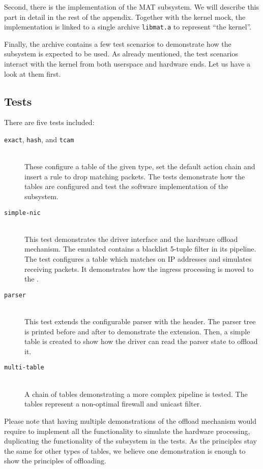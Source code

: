 Second, there is the implementation of the MAT subsystem. We will describe this
part in detail in the rest of the appendix. Together with the kernel mock, the
implementation is linked to a single archive \texttt{libmat.a} to represent
``the kernel''.

Finally, the archive contains a few test scenarios to demonstrate how the
subsystem is expected to be used. As already mentioned, the test scenarios
interact with the kernel from both userspace and hardware ends. Let us have
a look at them first.

\subsection{Tests}

There are five tests included:

\begin{description}
	\item[\texttt{exact}, \texttt{hash}, and \texttt{tcam}] \hfill \\
		These configure a table of the given type, set the default action chain
		and insert a rule to drop matching packets. The tests demonstrate how
		the tables are configured and test the software implementation of the
		subsystem.

	\item[\texttt{simple-nic}] \hfill \\
		This test demonstrates the driver interface and the hardware offload
		mechanism. The emulated  contains a blacklist 5-tuple filter in
		its pipeline. The test configures a table which matches on IP addresses
		and simulates receiving packets. It demonstrates how the ingress
		processing is moved to the .

	\item[\texttt{parser}] \hfill \\
		This test extends the configurable parser with the  header.
		The parser tree is printed before and after to demonstrate the
		extension. Then, a simple table is created to show how the driver can
		read the parser state to offload it.

	\item[\texttt{multi-table}] \hfill \\
		A chain of tables demonstrating a more complex pipeline is tested.
		The tables represent a non-optimal firewall and unicast  filter.
\end{description}

\noindent Please note that having multiple demonstrations of the offload
mechanism would require to implement all the functionality to simulate the
hardware processing, duplicating the functionality of the subsystem in the
tests. As the principles stay the same for other types of tables, we believe
one demonstration is enough to show the principles of offloading.

